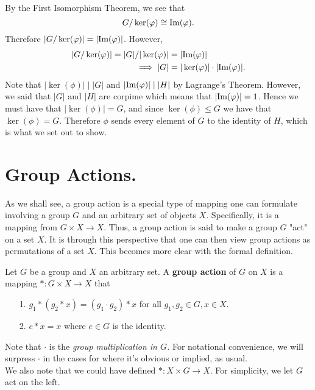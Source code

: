     \begin{prf}
        By the First Isomorphism Theorem, we see that 
        \[
            G/\ker(\varphi) \cong \mbox{Im}(\varphi).   
        \]
        Therefore $|G/\ker(\varphi)| = |\mbox{Im}(\varphi)|$. However, 
        \begin{align*}
            |G/\ker(\varphi)| = |G|/|\ker(\varphi)| &= |\mbox{Im}(\varphi)|\\ 
            \implies |G| &= |\ker(\varphi)| \cdot  |\mbox{Im}(\varphi)|.
        \end{align*}
        Note that $|\ker(\phi)| \mid |G|$ and $|\mbox{Im}(\varphi)| \mid |H|$ by
        Lagrange's Theorem. However, we said that $|G|$ and $|H|$ are
        corpime
        which means that $|\mbox{Im}(\varphi)| = 1$. Hence we
        must have that $|\ker(\phi)| = G$, and since $\ker(\phi) \le G$ we
        have that $\ker(\phi) = G$. Therefore $\phi$ sends every element
        of $G$ to the identity of $H$, which is what we set out to show.
    \end{prf}


    \newpage
    \section{Group Actions.}
    As we shall see, a group action is a special type of mapping one can
    formulate involving a group $G$ and an arbitrary set of objects $X$.
    Specifically, it is a mapping from $G \times X \to X$.
    Thus, a group action is said to make a group $G$ "act" on a set
    $X$. It is through this perspective that one can then view group
    actions as permutations of a set $X$. This becomes more clear with
    the formal definition. 

    \begin{definition}
        Let $G$ be a group and $X$ an arbitrary set. A \textbf{group
        action} of $G$ on $X$ is a mapping $* : G \times X \to X$
        that 
        \begin{itemize}
            \item[1.] $g_1 * (g_2 * x) = (g_1 \cdot g_2) * x$ for
            all $g_1, g_2 \in G, x \in X$.

            \item[2.] $e * x = x$ where $e \in G$ is the identity.
        \end{itemize}
    \end{definition}
    Note that $\cdot$ is the \textit{group multiplication in $G$.} For
    notational convenience, we will surpress $\cdot$ in the cases for
    where it's obvious or implied, as usual.
    \\
    We also note that we could have defined $*:X \times G \to X$. For
    simplicity, we let $G$ act on the left.
    \\  

